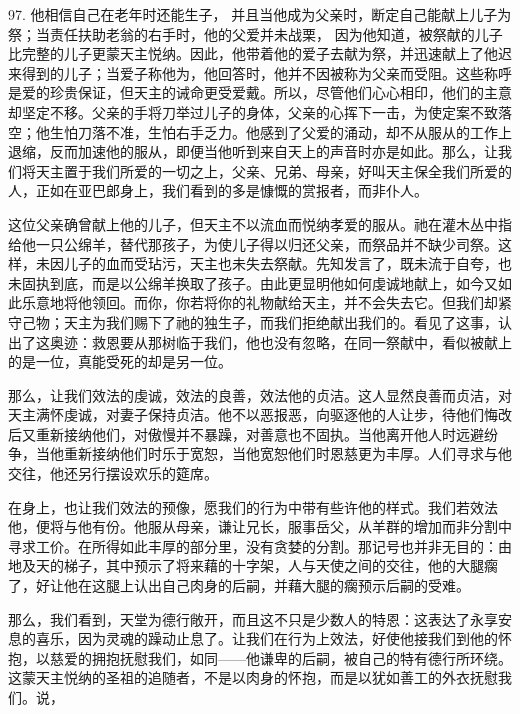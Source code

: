 97. 他相信自己在老年时还能生子，  并且当他成为父亲时，断定自己能献上儿子为祭；当责任扶助老翁的右手时，他的父爱并未战栗，  因为他知道，被祭献的儿子比完整的儿子更蒙天主悦纳。因此，他带着他的爱子去献为祭，并迅速献上了他迟来得到的儿子；当爱子称他为，他回答时，他并不因被称为父亲而受阻。这些称呼是爱的珍贵保证，但天主的诫命更受爱戴。所以，尽管他们心心相印，他们的主意却坚定不移。父亲的手将刀举过儿子的身体，父亲的心挥下一击，为使定案不致落空；他生怕刀落不准，生怕右手乏力。他感到了父爱的涌动，却不从服从的工作上退缩，反而加速他的服从，即便当他听到来自天上的声音时亦是如此。那么，让我们将天主置于我们所爱的一切之上，父亲、兄弟、母亲，好叫天主保全我们所爱的人，正如在亚巴郎身上，我们看到的多是慷慨的赏报者，而非仆人。\par

这位父亲确曾献上他的儿子，但天主不以流血而悦纳孝爱的服从。祂在灌木丛中指给他一只公绵羊，替代那孩子，为使儿子得以归还父亲，而祭品并不缺少司祭。这样，未因儿子的血而受玷污，天主也未失去祭献。先知发言了，既未流于自夸，也未固执到底，而是以公绵羊换取了孩子。由此更显明他如何虔诚地献上，如今又如此乐意地将他领回。而你，你若将你的礼物献给天主，并不会失去它。但我们却紧守己物；天主为我们赐下了祂的独生子，而我们拒绝献出我们的。看见了这事，认出了这奥迹：救恩要从那树临于我们，他也没有忽略，在同一祭献中，看似被献上的是一位，真能受死的却是另一位。\par

那么，让我们效法的虔诚，效法的良善，效法他的贞洁。这人显然良善而贞洁，对天主满怀虔诚，对妻子保持贞洁。他不以恶报恶，向驱逐他的人让步，待他们悔改后又重新接纳他们，对傲慢并不暴躁，对善意也不固执。当他离开他人时远避纷争，当他重新接纳他们时乐于宽恕，当他宽恕他们时恩慈更为丰厚。人们寻求与他交往，他还另行摆设欢乐的筵席。\par

在身上，也让我们效法的预像，愿我们的行为中带有些许他的样式。我们若效法他，便将与他有份。他服从母亲，谦让兄长，服事岳父，从羊群的增加而非分割中寻求工价。在所得如此丰厚的部分里，没有贪婪的分割。那记号也并非无目的：由地及天的梯子，其中预示了将来藉的十字架，人与天使之间的交往，他的大腿瘸了，好让他在这腿上认出自己肉身的后嗣，并藉大腿的瘸预示后嗣的受难。\par

那么，我们看到，天堂为德行敞开，而且这不只是少数人的特恩：这表达了永享安息的喜乐，因为灵魂的躁动止息了。让我们在行为上效法，好使他接我们到他的怀抱，以慈爱的拥抱抚慰我们，如同——他谦卑的后嗣，被自己的特有德行所环绕。这蒙天主悦纳的圣祖的追随者，不是以肉身的怀抱，而是以犹如善工的外衣抚慰我们。说，\par

